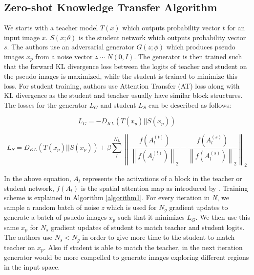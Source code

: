 \documentclass{article}
\begin{document}
\subsection{Zero-shot Knowledge Transfer Algorithm}
We starts with a teacher model $T(x)$ which outputs probability vector $t$ for an input image $x$. $S(x;\theta)$ is the student network which outputs probability vector $s$. The authors use an adversarial generator $G(z;\phi)$ which produces pseudo images $x_p$ from a noise vector $z\sim N(0,I)$. The generator is then trained such that the forward KL divergence loss between the logits of teacher and student on the pseudo images is maximized, while the student is trained to minimize this loss. For student training, authors use Attention Transfer (AT) loss \cite{zagoruyko2016paying} along with KL divergence as the student and teacher usually have similar block structures. The losses for the generator $L_G$ and student $L_S$ can be described as follows:

\begin{equation}
    L_G=-D_{KL}(T(x_p) || S(x_p))
\end{equation}

\begin{equation}
    L_S=D_{KL}(T(x_p) || S(x_p))+\beta \sum^{N_L}_{l}{\left\|\frac{f(A_l^{(t)})}{\left\|f(A_l^{(t)})\right\|_2}-\frac{f(A_l^{(s)})}{\left\|f(A_l^{(s)})\right\|_2} \right\|}_2
\end{equation}

In the above equation, $A_l$ represents the activations of a block in the teacher or student network, $f(A_l)$ is the spatial attention map as introduced by \cite{zagoruyko2016paying}. Training scheme is explained in Algorithm \ref{algorithm1}. For every iteration in \textit{N}, we sample a random batch of noise \textit{z} which is used for $N_g$ gradient updates to generate a batch of psuedo images $x_p$ such that it minimizes $L_G$. We then use this same $x_p$ for $N_s$ gradient updates of student to match teacher and student logits. The authors use $N_s < N_g$ in order to give more time to the student to match teacher on $x_p$. Also if student is able to match the teacher, in the next iteration generator would be more compelled to generate images exploring different regions in the input space.
\end{document}
